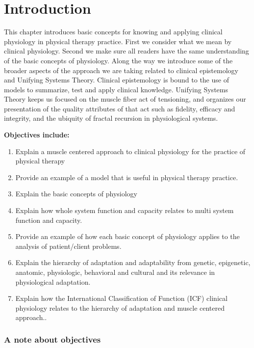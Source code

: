 \chapter*{Introduction}
\minitoc

This chapter introduces basic concepts for knowing and applying clinical physiology in physical therapy practice. First we consider what we mean by clinical physiology. Second we make sure all readers have the same understanding of the basic concepts of physiology. Along the way we introduce some of the broader aspects of the approach we are taking related to clinical epistemology and Unifying Systems Theory. Clinical epistemology is bound to the use of models to summarize, test and apply clinical knowledge. Unifying Systems Theory keeps us focused on the muscle fiber act of tensioning, and organizes our presentation of the quality attributes of that act such as fidelity, efficacy and integrity, and the ubiquity of fractal recursion in physiological systems. 

\vspace{5mm}

\textbf{Objectives include:}
\begin{enumerate}
    \item Explain a muscle centered approach to clinical physiology for the practice of physical therapy
    \item Provide an example of a model that is useful in physical therapy practice.
    \item Explain the basic concepts of physiology
    \item Explain how whole system function and capacity relates to multi system function and capacity. 
    \item Provide an example of how each basic concept of physiology applies to the analysis of patient/client problems.
    \item Explain the hierarchy of adaptation and adaptability from genetic, epigenetic, anatomic, physiologic, behavioral and cultural and its relevance in physiological adaptation.
    \item Explain how the International Classification of Function (ICF) clinical physiology relates to the hierarchy of adaptation and muscle centered approach..
\end{enumerate}

\subsection{A note about objectives}

